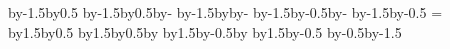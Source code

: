 {{    \centerpoint\advance\pgf@x by-1.5\pgfutil@tempdimc\advance\pgf@y by0.5\pgfutil@tempdimd\pgfpathmoveto{\pgfpoint{\pgf@x}{\pgf@y}}
    \centerpoint\advance\pgf@x by-1.5\pgfutil@tempdimc\advance\pgf@y by0.5\pgfutil@tempdimd\advance\pgf@x by-\pgfutil@tempdime\pgfpathlineto{\pgfpoint{\pgf@x}{\pgf@y}}
    \centerpoint\advance\pgf@x by-1.5\pgfutil@tempdimc\advance\pgf@y by\pgfutil@tempdimf\advance\pgf@x by-\pgfutil@tempdime\pgfpathlineto{\pgfpoint{\pgf@x}{\pgf@y}}
    \centerpoint\advance\pgf@x by-1.5\pgfutil@tempdimc\advance\pgf@y by-0.5\pgfutil@tempdimd\advance\pgf@x by-\pgfutil@tempdime\pgfpathlineto{\pgfpoint{\pgf@x}{\pgf@y}}
    \centerpoint\advance\pgf@x by-1.5\pgfutil@tempdimc\advance\pgf@y by-0.5\pgfutil@tempdimd\pgfpathlineto{\pgfpoint{\pgf@x}{\pgf@y}}
    \pgfutil@tempdime=\tactright
    \centerpoint\advance\pgf@x by1.5\pgfutil@tempdimc\advance\pgf@y by0.5\pgfutil@tempdimd\pgfpathmoveto{\pgfpoint{\pgf@x}{\pgf@y}}
    \centerpoint\advance\pgf@x by1.5\pgfutil@tempdimc\advance\pgf@y by0.5\pgfutil@tempdimd\advance\pgf@x by\pgfutil@tempdime\pgfpathlineto{\pgfpoint{\pgf@x}{\pgf@y}}
    \centerpoint\advance\pgf@x by1.5\pgfutil@tempdimc\advance\pgf@y by-0.5\pgfutil@tempdimd\advance\pgf@x by\pgfutil@tempdime\pgfpathlineto{\pgfpoint{\pgf@x}{\pgf@y}}
    \centerpoint\advance\pgf@x by1.5\pgfutil@tempdimc\advance\pgf@y by-0.5\pgfutil@tempdimd\pgfpathlineto{\pgfpoint{\pgf@x}{\pgf@y}}
    \color{black}
    \begingroup
    \tikzset{pcb/part labels} %
    \tikz@textfont
    \centerpoint\advance\pgf@y by-0.5\pgfutil@tempdimd\advance\pgf@y by-1.5\pgfutil@tempdimb
    \endgroup
  }
}
% 
